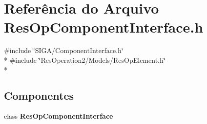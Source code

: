 \section{Referência do Arquivo Res\+Op\+Component\+Interface.\+h}
\label{_res_op_component_interface_8h}
{\ttfamily \#include \char`\"{}S\+I\+G\+A/\+Component\+Interface.\+h\char`\"{}}\\*
{\ttfamily \#include \char`\"{}Res\+Operation2/\+Models/\+Res\+Op\+Element.\+h\char`\"{}}\\*
\subsection*{Componentes}
\begin{DoxyCompactItemize}
\item 
class {\bf Res\+Op\+Component\+Interface}
\end{DoxyCompactItemize}
